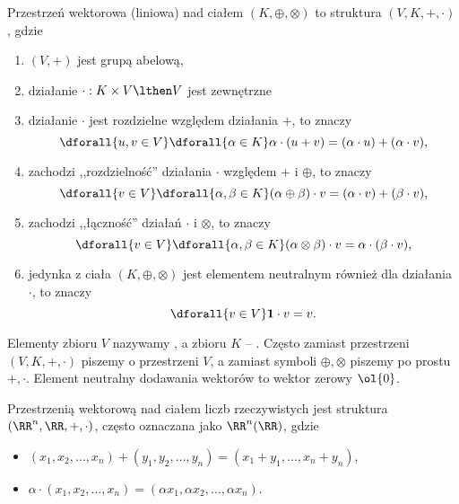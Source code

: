 \begin{definition}
    \label{d:vector_space}
    Przestrzeń wektorowa (liniowa) nad ciałem $(K, \oplus, \otimes)$ to struktura $(V, K, +, \cdot)$, gdzie
    \begin{enumerate}
        \item $(V, +)$ jest grupą abelową,
        \item działanie $\cdot : K \times V \lthen V$ jest zewnętrzne
        \item działanie $\cdot$ jest rozdzielne względem działania $+$, to znaczy
            \[ \dforall{u, v \in V} \dforall{\alpha \in K} \alpha\cdot(u + v) = (\alpha \cdot u) + (\alpha \cdot v), \]
        \item zachodzi ,,rozdzielność'' działania $\cdot$ względem $+$ i $\oplus$, to znaczy
            \[ \dforall{v \in V} \dforall{\alpha, \beta \in K} (\alpha \oplus \beta) \cdot v = (\alpha \cdot v) + (\beta \cdot v), \]
        \item zachodzi ,,łączność'' działań $\cdot$ i $\otimes$, to znaczy
            \[ \dforall{v \in V} \dforall{\alpha, \beta \in K} (\alpha \otimes \beta) \cdot v = \alpha \cdot (\beta \cdot v), \]
        \item jedynka z ciała $(K, \oplus, \otimes)$ jest elementem neutralnym również dla działania $\cdot$, to znaczy
            \[ \dforall{v \in V} \mathbf{1} \cdot v = v. \]
    \end{enumerate}
\end{definition}

Elementy zbioru $V$ nazywamy , a zbioru $K$ -- . Często zamiast przestrzeni $(V, K, +, \cdot)$ piszemy o przestrzeni $V$, a zamiast symboli $\oplus, \otimes$ piszemy po prostu $+, \cdot$. Element neutralny dodawania wektorów to wektor zerowy $\ol{0}$.

\begin{example}
    Przestrzenią wektorową nad ciałem liczb rzeczywistych jest struktura $(\RR^n, \RR, +, \cdot)$, często oznaczana jako $\RR^n(\RR)$, gdzie
    \begin{itemize}[noitemsep,nolistsep]
        \item $(x_1, x_2, \ldots, x_n) + (y_1, y_2, \ldots, y_n) = (x_1 + y_1, \ldots, x_n + y_n)$,
        \item $\alpha \cdot (x_1, x_2, \ldots, x_n) = (\alpha x_1, \alpha x_2, \ldots, \alpha x_n)$.
    \end{itemize}
\end{example}

